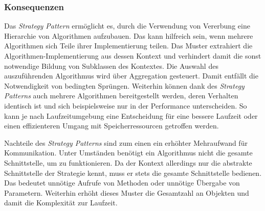 \subsubsection*{Konsequenzen}
Das \emph{Strategy Pattern} ermöglicht es, durch die Verwendung von Vererbung eine Hierarchie von Algorithmen aufzubauen. Das kann hilfreich sein, wenn mehrere Algorithmen sich Teile ihrer Implementierung teilen. Das Muster extrahiert die Algorithmen-Implementierung aus dessen Kontext und verhindert damit die sonst notwendige Bildung von Subklassen des Kontextes. Die Auswahl des auszuführenden Algorithmus wird über Aggregation gesteuert. Damit entfällt die Notwendigkeit von bedingten Sprüngen. Weiterhin können dank des \emph{Strategy Patterns} auch mehrere Algorithmen bereitgestellt werden, deren Verhalten identisch ist und sich beispielsweise nur in der Performance unterscheiden. So kann je nach Laufzeitumgebung eine Entscheidung für eine bessere Laufzeit oder einen effizienteren Umgang mit Speicherressourcen getroffen werden.

Nachteile des \emph{Strategy Patterns} sind zum einen ein erhöhter Mehraufwand für Kommunikation. Unter Umständen benötigt ein Algorithmus nicht die gesamte Schnittstelle, um zu funktionieren. Da der Kontext allerdings nur die abstrakte Schnittstelle der Strategie kennt, muss er stets die gesamte Schnittstelle bedienen. Das bedeutet unnötige Aufrufe von Methoden oder unnötige Übergabe von Parametern. Weiterhin erhöht dieses Muster die Gesamtzahl an Objekten und damit die Komplexität zur Laufzeit. \cite{gamma_design_1995}